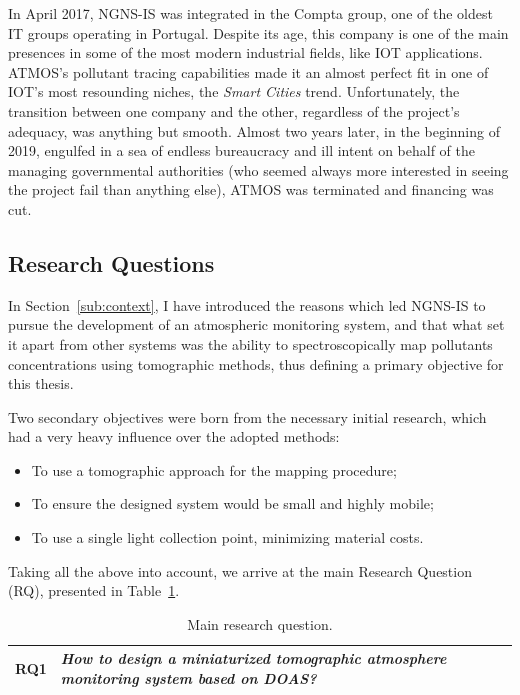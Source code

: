 In April 2017, NGNS-IS was integrated in the Compta group, one of the
oldest IT groups operating in Portugal. Despite its age, this company is
one of the main presences in some of the most modern industrial fields,
like \gls{IOT} applications. \gls{ATMOS}'s pollutant tracing
capabilities made it an almost perfect fit in one of \gls{IOT}'s most
resounding niches, the \emph{Smart Cities} trend. Unfortunately, the
transition between one company and the other, regardless of the
project's adequacy, was anything but smooth. Almost two years later, in
the beginning of 2019, engulfed in a sea of endless bureaucracy and ill
intent on behalf of the managing governmental authorities (who seemed
always more interested in seeing the project fail than anything else),
\gls{ATMOS} was terminated and financing was cut.

\subsection{Research Questions}%
\label{sub:research_questions}

In Section~\ref{sub:context}, I have introduced the reasons which led
NGNS-IS to pursue the development of an atmospheric monitoring system,
and that what set it apart from other systems was the ability to
spectroscopically map pollutants concentrations using tomographic
methods, thus defining a primary objective for this thesis.

Two secondary objectives were born from the necessary initial research,
which had a very heavy influence over the adopted methods:
\begin{itemize}
    \item To use a tomographic approach for the mapping procedure;
    \item To ensure the designed system would be small and highly
        mobile;
    \item To use a single light collection point, minimizing material
        costs.
\end{itemize}

Taking all the above into account, we arrive at the main Research
Question (\gls{RQ}), presented in Table~\ref{tab:RQ1}.
\begin{table}[htpb]
    \centering
    \caption{Main research question.}
    \label{tab:RQ1}
    \begin{tabularx}{0.8\textwidth}{cX}
        \toprule
        \textbf{RQ1}&\emph{ How to design a miniaturized tomographic
        atmosphere monitoring system based on DOAS? }\\
        \bottomrule
    \end{tabularx}
\end{table}

